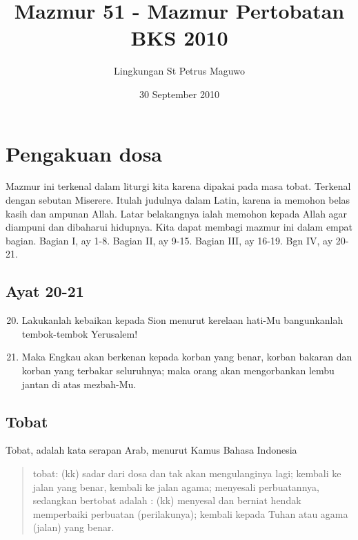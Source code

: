 \documentclass[a4paper]{article}
\title{Mazmur 51 - Mazmur Pertobatan\\BKS 2010}
\author{Lingkungan St Petrus Maguwo}
\date{30 September 2010}
\begin{document}
\maketitle
\section*{Pengakuan dosa}
Mazmur ini terkenal dalam liturgi kita karena dipakai pada masa tobat. Terkenal dengan sebutan Miserere. Itulah judulnya dalam Latin, karena ia memohon belas kasih dan ampunan Allah. Latar belakangnya ialah memohon kepada Allah agar diampuni dan dibaharui hidupnya. Kita dapat membagi mazmur ini dalam empat bagian. Bagian I, ay 1-8. Bagian II, ay 9-15. Bagian III, ay 16-19. Bgn IV, ay 20-21. 

\subsection*{Ayat 20-21}
\begin{enumerate}
\setcounter{enumi}{19}
\item Lakukanlah kebaikan kepada Sion menurut kerelaan hati-Mu bangunkanlah tembok-tembok Yerusalem!

\item Maka Engkau akan berkenan kepada korban yang benar, korban bakaran dan korban yang terbakar seluruhnya; maka orang akan mengorbankan lembu jantan di atas mezbah-Mu.
\end{enumerate}


\subsection*{Tobat}
Tobat, adalah kata serapan Arab, menurut Kamus Bahasa Indonesia 
\begin{quote}
tobat: (kk) sadar dari dosa dan tak akan mengulanginya lagi; kembali ke jalan yang benar, kembali ke jalan agama; menyesali perbuatannya, sedangkan bertobat adalah : (kk) menyesal dan berniat hendak memperbaiki perbuatan (perilakunya); kembali kepada Tuhan atau agama (jalan) yang benar.
\end{quote}
\end{document}
